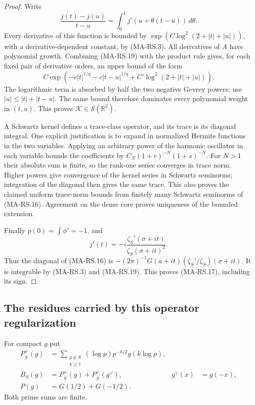 \begin{proof}
Write
\[
       \frac{j(t)-j(u)}{t-u}
           =\int_0^1 j'(u+\theta(t-u))\,d\theta .
 \tag{MA-RS.22}
\]
Every derivative of this function is bounded by
$\exp(C\log^2(2+|t|+|u|))$, with a derivative-dependent
constant, by (MA-RS.3).
All derivatives of $A$ have polynomial growth.
Combining (MA-RS.19) with the product rule gives,
for each fixed pair of derivative orders, an upper
bound of the form
\[
 C\exp\!\left(
     -c|t|^{1/q}-c|t-u|^{1/q}
             +C'\log^2(2+|t|+|u|)\right).
 \tag{MA-RS.23}
\]
The logarithmic term is absorbed by half the two
negative Gevrey powers; use
$|u|\le|t|+|t-u|$.
The same bound therefore dominates every polynomial
weight in $(t,u)$.  This proves
$\mathcal K\in\mathcal S(\mathbb R^2)$.

A Schwartz kernel defines a trace-class operator,
and its trace is its diagonal integral.  One explicit
justification is to expand in normalized Hermite
functions in the two variables.  Applying an arbitrary
power of the harmonic oscillator in each variable
bounds the coefficients by
$C_N(1+r)^{-N}(1+s)^{-N}$.
For $N>1$ their absolute sum is finite, so the
rank-one series converges in trace norm.
Higher powers give convergence of the kernel series
in Schwartz seminorms; integration of the diagonal
then gives the same trace.  This also proves the
claimed uniform trace-norm bounds from finitely many
Schwartz seminorms of (MA-RS.16).
Agreement on the dense core proves uniqueness of
the bounded extension.

Finally $p(0)=\int\phi'=-1$, and
\[
             j'(t)=-i\frac{\zeta_S'(\sigma+it)}
                                  {\zeta_S(\sigma+it)^2}.
 \tag{MA-RS.24}
\]
Thus the diagonal of (MA-RS.16) is
$-(2\pi)^{-1}G(a+it)(\zeta_S'/\zeta_S)(\sigma+it)$.
It is integrable by (MA-RS.3) and (MA-RS.19).
This proves (MA-RS.17), including its sign.
\end{proof}

\subsection{The residues carried by this operator regularization}

For compact $g$ put
\[
 \begin{aligned}
 P_{\overline S}^{+}(g)&=
       \sum_{\substack{p\notin S\\k\ge1}}
          (\log p)p^{-k/2}g(k\log p),\\
 B_{\overline S}(g)&=
          P_{\overline S}^{+}(g)+P_{\overline S}^{+}(g^\vee),
       &g^\vee(x)&=g(-x),\\
 P(g)&=G(1/2)+G(-1/2).
 \end{aligned}
 \tag{MA-RS.25}
\]
Both prime sums are finite.

